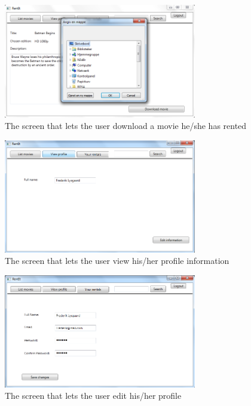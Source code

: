 \begin{figure}[h!]
  \centering
    \includegraphics[width=0.75\textwidth]{Parts/Appendix/Images/Downloadmovie}
  \caption{The screen that lets the user download a movie he/she has rented}
  \label{fig:Appendix_GUI_PrototypeDownload}
\end{figure}

\begin{figure}[h!]
  \centering
    \includegraphics[width=0.75\textwidth]{Parts/Appendix/Images/Viewprofile}
  \caption{The screen that lets the user view his/her profile information}
  \label{fig:Appendix_GUI_PrototypeViewprofile}
\end{figure}
\clearpage
\begin{figure}[h!]
  \centering
    \includegraphics[width=0.75\textwidth]{Parts/Appendix/Images/Editprofile}
  \caption{The screen that lets the user edit his/her profile}
  \label{fig:Appendix_GUI_PrototypeEditprofile}
\end{figure}


